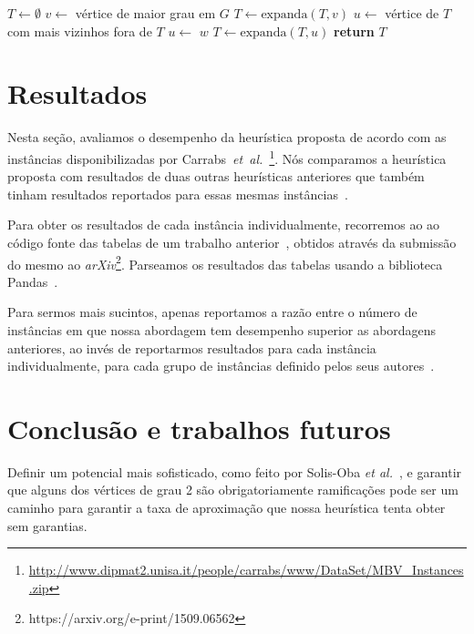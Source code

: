 \documentclass[conference]{IEEEtran}
\begin{document}
\begin{algorithm}
  \caption{Algoritmo heur\'istico para evitar expans\~ao de v\'ertices com 2 vizinhos n\~ao expandidos.}
  \label{algo:heuristic}
    \begin{algorithmic}[1] %
            \State $T \gets \emptyset$
            \State $v \gets$ v\'ertice de maior grau em $G$
            \State $T \gets \mathrm{expanda}(T, v)$
            \State
             \label{algo:while}
              \State $u \gets$ v\'ertice de $T$ com mais vizinhos fora de $T$
               \label{algo:if}
                \State $u \gets$ $w$ 
              \EndIf
              \State $T \gets \mathrm{expanda}(T, u)$
            \EndWhile
            \State
            \State \textbf{return} $T$
        \EndProcedure
    \end{algorithmic}
\end{algorithm}

\section{Resultados}
Nesta se\c{c}\~ao, avaliamos o desempenho da heur\'istica proposta de acordo com as inst\^ancias
disponibilizadas por
Carrabs~\textit{et~al.}~\cite{carrabs2013}\footnote{\url{http://www.dipmat2.unisa.it/people/carrabs/www/DataSet/MBV\_Instances.zip}}.
N\'os comparamos a heur\'istica proposta com resultados de duas outras heur\'isticas anteriores
que tamb\'em tinham resultados reportados para essas mesmas
inst\^ancias~\cite{carrabs2013, cerulli2009, melo2016}.

Para obter os resultados de cada inst\^ancia individualmente, recorremos ao ao c\'odigo fonte das
tabelas de um trabalho anterior~\cite{melo2016}, obtidos atrav\'es da submiss\~ao do mesmo ao
\textit{arXiv}\footnote{https://arxiv.org/e-print/1509.06562}. Parseamos os resultados das tabelas
usando a biblioteca Pandas~\cite{pandas}.

Para sermos mais sucintos, apenas reportamos a raz\~ao entre o n\'umero de inst\^ancias em que nossa
abordagem tem desempenho superior as abordagens anteriores, ao inv\'es de reportarmos resultados para
cada inst\^ancia individualmente, para cada grupo de inst\^ancias definido pelos seus autores~\cite{carrabs2013}.

\section{Conclus\~ao e trabalhos futuros}
Definir um potencial mais sofisticado, como feito por Solis-Oba \textit{et al.}~\cite{solis-oba2017}, e garantir que alguns dos v\'ertices de grau 2 s\~ao obrigatoriamente ramifica\c{c}\~oes pode ser um caminho para garantir a taxa de aproxima\c{c}\~ao que nossa heur\'istica tenta obter sem garantias.



\end{document}
